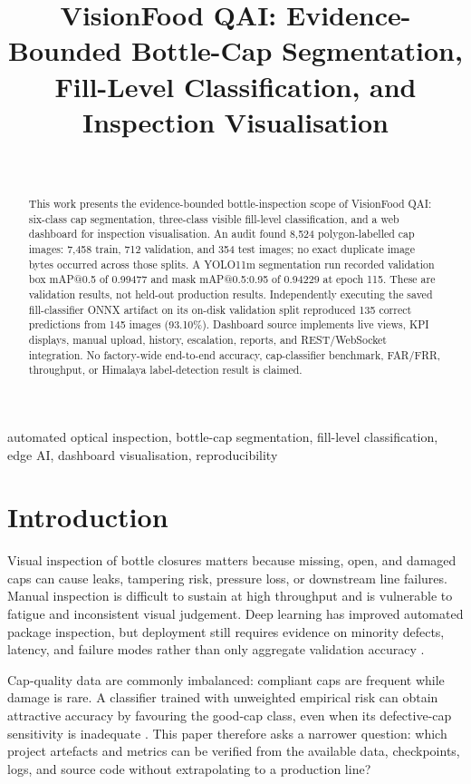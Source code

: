 \documentclass[conference]{../IEEE_paper/IEEEtran}
\title{VisionFood QAI: Evidence-Bounded Bottle-Cap Segmentation, Fill-Level Classification, and Inspection Visualisation}
\author{\IEEEauthorblockN{Shreyas Bairy K S, Sushanth S, and Ullas N}\\
\IEEEauthorblockA{Department of Computer Science and Engineering (Data Science), B.M.S. College of Engineering, Bengaluru, India\\
Under the guidance of Prof. Nayana N Kumar}}
\begin{document}
\maketitle

\begin{abstract}
This work presents the evidence-bounded bottle-inspection scope of VisionFood QAI: six-class cap segmentation, three-class visible fill-level classification, and a web dashboard for inspection visualisation. An audit found 8,524 polygon-labelled cap images: 7,458 train, 712 validation, and 354 test images; no exact duplicate image bytes occurred across those splits. A YOLO11m segmentation run recorded validation box mAP@0.5 of 0.99477 and mask mAP@0.5:0.95 of 0.94229 at epoch 115. These are validation results, not held-out production results. Independently executing the saved fill-classifier ONNX artifact on its on-disk validation split reproduced 135 correct predictions from 145 images (93.10\%). Dashboard source implements live views, KPI displays, manual upload, history, escalation, reports, and REST/WebSocket integration. No factory-wide end-to-end accuracy, cap-classifier benchmark, FAR/FRR, throughput, or Himalaya label-detection result is claimed.
\end{abstract}
\begin{IEEEkeywords}automated optical inspection, bottle-cap segmentation, fill-level classification, edge AI, dashboard visualisation, reproducibility\end{IEEEkeywords}

\section{Introduction}
Visual inspection of bottle closures matters because missing, open, and damaged caps can cause leaks, tampering risk, pressure loss, or downstream line failures. Manual inspection is difficult to sustain at high throughput and is vulnerable to fatigue and inconsistent visual judgement. Deep learning has improved automated package inspection, but deployment still requires evidence on minority defects, latency, and failure modes rather than only aggregate validation accuracy \cite{banus2021,liu2025,xiong2024}.

Cap-quality data are commonly imbalanced: compliant caps are frequent while damage is rare. A classifier trained with unweighted empirical risk can obtain attractive accuracy by favouring the good-cap class, even when its defective-cap sensitivity is inadequate \cite{buda2018,cui2019}. This paper therefore asks a narrower question: which project artefacts and metrics can be verified from the available data, checkpoints, logs, and source code without extrapolating to a production line?
\end{document}
